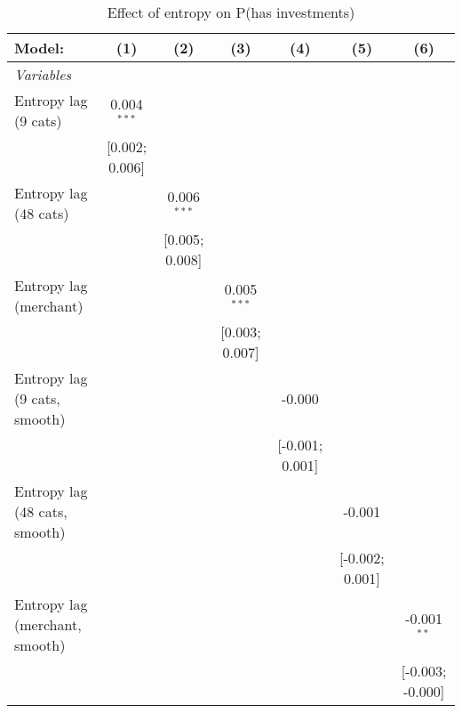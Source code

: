 
\begin{table}[htbp]
   \centering
   \tiny
   \begin{threeparttable}[b]
      \caption{\label{tab:reg_has_investments_cnz} Effect of entropy on P(has investments)}
      \begin{tabular}{lcccccc}
         \tabularnewline \midrule \midrule
         Model:                         & (1)            & (2)            & (3)            & (4)             & (5)             & (6)\\  
         \midrule
         \emph{Variables}\\
         Entropy lag (9 cats)           & 0.004$^{***}$  &                &                &                 &                 &   \\   
                                        & [0.002; 0.006] &                &                &                 &                 &   \\   
         Entropy lag (48 cats)          &                & 0.006$^{***}$  &                &                 &                 &   \\   
                                        &                & [0.005; 0.008] &                &                 &                 &   \\   
         Entropy lag (merchant)         &                &                & 0.005$^{***}$  &                 &                 &   \\   
                                        &                &                & [0.003; 0.007] &                 &                 &   \\   
         Entropy lag (9 cats, smooth)   &                &                &                & -0.000          &                 &   \\   
                                        &                &                &                & [-0.001; 0.001] &                 &   \\   
         Entropy lag (48 cats, smooth)  &                &                &                &                 & -0.001          &   \\   
                                        &                &                &                &                 & [-0.002; 0.001] &   \\   
         Entropy lag (merchant, smooth) &                &                &                &                 &                 & -0.001$^{**}$\\   
                                        &                &                &                &                 &                 & [-0.003; -0.000]\\   

\end{tabular}
\end{threeparttable}
\end{table}
